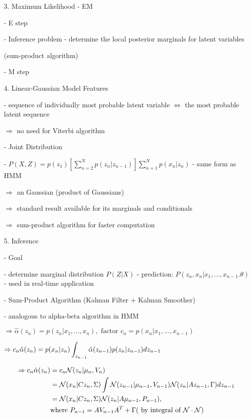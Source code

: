 3. Maximum Likelihood - EM

   - E step 

     - Inference problem - determine the local posterior marginals for latent variables 

       (sum-product algorithm)

   - M step

4. Linear-Gaussian Model Features

   - sequence of individually most probable latent variable $\Leftrightarrow$ the most probable latent sequence

     $\Rightarrow$ no need for Viterbi algorithm

   - Joint Distribution

     - $\displaystyle P(X,Z) = p(z_1) \left[ \sum_{n=2}^Np(z_n|z_{n-1}) \right] \sum_{n=1}^N p(x_n|z_n)$  - same form as HMM

       $\Rightarrow$ an Gaussian (product of Gaussians)

       $\Rightarrow$ standard result available for its marginals and conditionals 

       $\Rightarrow$ sum-product algorithm for faster computation

5. Inference

   - Goal

     - determine marginal distribution $P(Z|X)$ 
     - prediction: $P(z_n, x_n|x_1,...,x_{n-1}.\theta)$ - used in real-time application

   - Sum-Product Algorithm (Kalman Filter + Kalman Smoother)

     - analogous to $\text{alpha-beta algorithm}$ in HMM

       $\Rightarrow \hat \alpha(z_n) = p(z_n| x_1,...,x_n), \text{ factor } c_n=p(x_n|x_1,...,x_{n-1})$  

       $ \displaystyle \Rightarrow c_n \hat\alpha(z_n) = p(x_n|z_n) \int_{z_{n-1}}\hat\alpha(z_{n-1}) p(z_n|z_{n-1}) \space d z_{n-1}$ 

       \begin{align}\displaystyle \Rightarrow c_n \hat \alpha(z_n) &= c_n \mathcal N(z_n|\mu_n,V_n) \\ &= \mathcal N (x_n|C z_n,\Sigma) \int \mathcal N(z_{n-1} | \mu_{n-1},V_{n-1}) \mathcal N(z_n|Az_{n-1} , \Gamma) \space d z_{n-1} \\ &= \mathcal N (x_n|C z_n,\Sigma) \space \mathcal N (z_n|A\mu_{n-1},P_{n-1}), \\ & \text{where } P_{n-1} = AV_{n-1}A^T+\Gamma \space ( \text{ by integral of } \mathcal N\cdot\mathcal N ) \end{align}

